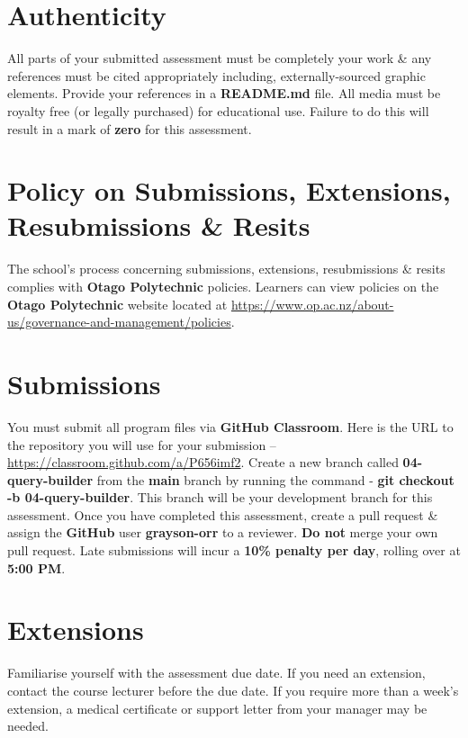 \documentclass{article}
\begin{document}
\section*{Authenticity}
All parts of your submitted assessment must be completely your work \& any references must be cited appropriately including, externally-sourced graphic elements. Provide your references in a \textbf{README.md} file. All media must be royalty free (or legally purchased) for educational use. Failure to do this will result in a mark of \textbf{zero} for this assessment.

\section*{Policy on Submissions, Extensions, Resubmissions \& Resits}
The school's process concerning submissions, extensions, resubmissions \& resits complies with \textbf{Otago Polytechnic} policies. Learners can view policies on the \textbf{Otago Polytechnic} website located at \href{https://www.op.ac.nz/about-us/governance-and-management/policies}{https://www.op.ac.nz/about-us/governance-and-management/policies}.

\section*{Submissions}
You must submit all program files via \textbf{GitHub Classroom}. Here is the URL to the repository you will use for your submission – \href{https://classroom.github.com/a/P656imf2}{https://classroom.github.com/a/P656imf2}. Create a new branch called  \textbf{04-query-builder} from the \textbf{main} branch by running the command - \textbf{git checkout -b 04-query-builder}. This branch will be your development branch for this assessment. Once you have completed this assessment, create a pull request \& assign the \textbf{GitHub} user \textbf{grayson-orr} to a reviewer. \textbf{Do not} merge your own pull request. Late submissions will incur a \textbf{10\% penalty per day}, rolling over at \textbf{5:00 PM}.

\section*{Extensions}
Familiarise yourself with the assessment due date. If you need an extension, contact the course lecturer before the due date. If you require more than a week's extension, a medical certificate or support letter from your manager may be needed.
\end{document}
